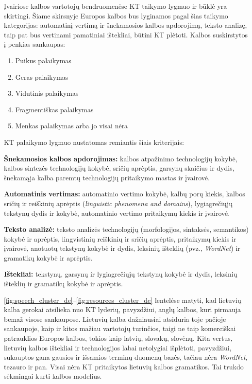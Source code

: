 \begin{multicols}{2}
 Įvairiose kalbos vartotojų bendruomenėse KT taikymo lygmuo ir būklė yra skirtingi. Šiame skirsnyje Europos kalbos bus lyginamos pagal šias taikymo kategorijas: automatinį vertimą ir šnekamosios kalbos apdorojimą, teksto analizę, taip pat bus vertinami pamatiniai ištekliai, būtini KT plėtoti. Kalbos suskirstytos į penkias sankaupas:

\begin{enumerate}
\item Puikus palaikymas
\item Geras palaikymas
\item Vidutinis palaikymas
\item Fragmentiškas palaikymas
\item Menkas palaikymas arba jo visai nėra
\end{enumerate}

KT palaikymo lygmuo nustatomas remiantis šiais kriterijais:

\textbf{Šnekamosios kalbos apdorojimas:} kalbos atpažinimo technologijų kokybė, kalbos sintezės technologijų kokybė, sričių aprėptis, garsynų skaičius ir dydis, šnekamąja kalba paremtų technologijų pritaikymo mastas ir įvairovė.

\textbf{Automatinis vertimas:} automatinio vertimo kokybė, kalbų porų kiekis, kalbos sričių ir reiškinių aprėptis (\textit{linguistic phenomena and domains}), lygiagrečiųjų tekstynų dydis ir kokybė, automatinio vertimo pritaikymų kiekis ir įvairovė.

\textbf{Teksto analizė:} teksto analizės technologijų (morfologijos, sintaksės, semantikos) kokybė ir aprėptis, lingvistinių reiškinių ir sričių aprėptis, pritaikymų kiekis ir įvairovė, anotuotų tekstynų kokybė ir dydis, leksinių išteklių (pvz., \textit{WordNet}) ir gramatikų kokybė ir aprėptis.

\textbf{Ištekliai:} tekstynų, garsynų ir lygiagrečiųjų tekstynų kokybė ir dydis, leksinių išteklių ir gramatikų kokybė ir aprėptis.

\ref{fig:speech_cluster_de}–\ref{fig:resources_cluster_de} lentelėse matyti, kad lietuvių kalba gerokai atsilieka nuo KT lyderių, pavyzdžiui, anglų kalbos, kuri pirmauja bemaž visose sankaupose. Lietuvių kalba dažniausiai atsiduria toje pačioje sankaupoje, kaip ir kitos mažiau vartotojų turinčios, taigi ne taip komerciškai patrauklios Europos kalbos, tokios kaip latvių, slovakų, slovėnų. Kita vertus, lietuvių kalbos ištekliai ir technologijos labai netolygiai išplėtoti, pavyzdžiui, sukauptos gana gausios ir išsamios terminų duomenų bazės, tačiau nėra \textit{WordNet}, tezauro ir pan. Visai nėra KT pritaikytos lietuvių kalbos gramatikos. Tai trukdo sėkmingai kurti kalbos modelius.


\end{multicols}
